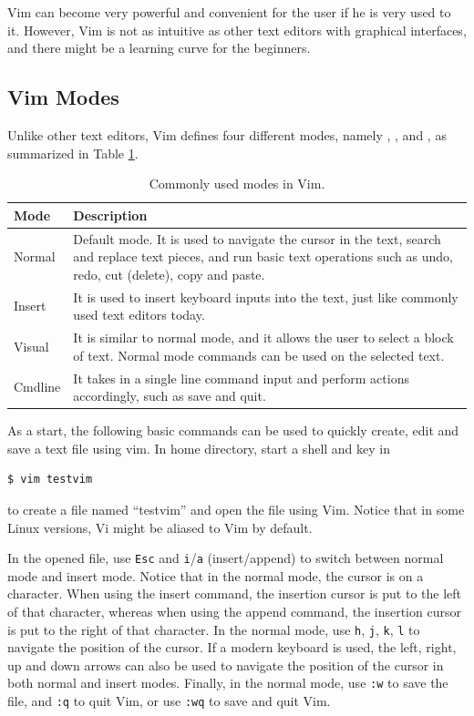 Vim can become very powerful and convenient for the user if he is very used to it. However, Vim is not as intuitive as other text editors with graphical interfaces, and there might be a learning curve for the beginners.

\subsection{Vim Modes} \label{ch:tfe:subsec:vimgeneralintro}

Unlike other text editors, Vim defines four different modes, namely , ,  and , as summarized in Table \ref{ch:tfe:tab:vimmodes}.

\begin{table}[!htb]
  \centering \caption{Commonly used modes in Vim.}\label{ch:tfe:tab:vimmodes}
  \begin{tabularx}{\textwidth}{lX}
    \hline
    Mode & Description \\ \hline
    Normal & Default mode. It is used to navigate the cursor in the text, search and replace text pieces, and run basic text operations such as undo, redo, cut (delete), copy and paste. \\ 
    Insert & It is used to insert keyboard inputs into the text, just like commonly used text editors today. \\ 
    Visual & It is similar to normal mode, and it allows the user to select a block of text. Normal mode commands can be used on the selected text. \\ 
    Cmdline & It takes in a single line command input and perform actions accordingly, such as save and quit. \\
    \hline
  \end{tabularx}
\end{table}

As a start, the following basic commands can be used to quickly create, edit and save a text file using vim. In home directory, start a shell and key in
\begin{lstlisting}
$ vim testvim
\end{lstlisting}
to create a file named ``testvim'' and open the file using Vim. Notice that in some Linux versions, Vi might be aliased to Vim by default.

In the opened file, use \verb|Esc| and \verb|i|/\verb|a| (insert/append) to switch between normal mode and insert mode. Notice that in the normal mode, the cursor is on a character. When using the insert command, the insertion cursor is put to the left of that character, whereas when using the append command, the insertion cursor is put to the right of that character. In the normal mode, use \verb|h|, \verb|j|, \verb|k|, \verb|l| to navigate the position of the cursor. If a modern keyboard is used, the left, right, up and down arrows can also be used to navigate the position of the cursor in both normal and insert modes. Finally, in the normal mode, use \verb|:w| to save the file, and \verb|:q| to quit Vim, or use \verb|:wq| to save and quit Vim.

